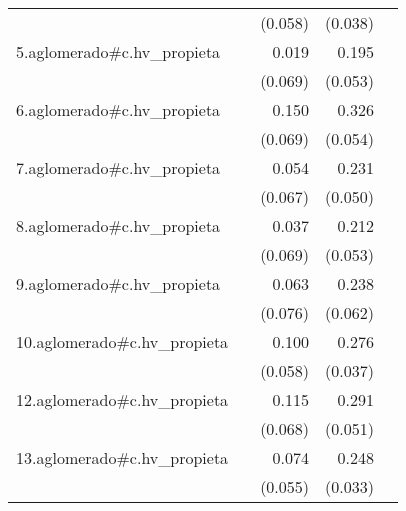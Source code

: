 {\begin{longtable}{l*{4}{D{.}{.}{-1}}}
            &                     &     (0.058)         &     (0.038)         &                     \\
\addlinespace
5.aglomerado#c.hv\_propieta&                     &       0.019         &       0.195\sym{***}&                     \\
            &                     &     (0.069)         &     (0.053)         &                     \\
\addlinespace
6.aglomerado#c.hv\_propieta&                     &       0.150\sym{*}  &       0.326\sym{***}&                     \\
            &                     &     (0.069)         &     (0.054)         &                     \\
\addlinespace
7.aglomerado#c.hv\_propieta&                     &       0.054         &       0.231\sym{***}&                     \\
            &                     &     (0.067)         &     (0.050)         &                     \\
\addlinespace
8.aglomerado#c.hv\_propieta&                     &       0.037         &       0.212\sym{***}&                     \\
            &                     &     (0.069)         &     (0.053)         &                     \\
\addlinespace
9.aglomerado#c.hv\_propieta&                     &       0.063         &       0.238\sym{***}&                     \\
            &                     &     (0.076)         &     (0.062)         &                     \\
\addlinespace
10.aglomerado#c.hv\_propieta&                     &       0.100         &       0.276\sym{***}&                     \\
            &                     &     (0.058)         &     (0.037)         &                     \\
\addlinespace
12.aglomerado#c.hv\_propieta&                     &       0.115         &       0.291\sym{***}&                     \\
            &                     &     (0.068)         &     (0.051)         &                     \\
\addlinespace
13.aglomerado#c.hv\_propieta&                     &       0.074         &       0.248\sym{***}&                     \\
            &                     &     (0.055)         &     (0.033)         &                     \\

\end{longtable}}
